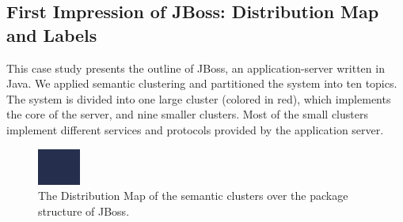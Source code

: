 \subsection{First Impression of JBoss: Distribution Map and Labels}\label{sec:azureus}

This case study presents the outline of JBoss, an application-server written in Java. We applied semantic clustering and partitioned the system into ten topics. The system is divided into one large cluster (colored in red), which implements the core of the server, and nine smaller clusters. Most of the small clusters implement different services and protocols provided by the application server.

\begin{figure}[htbp]
\begin{center}
  \includegraphics[width=\linewidth]{JBossDistribution}
  \caption{The Distribution Map of the semantic clusters over the package structure of JBoss.}
  \label{fig:JBossDistribution}
\end{center}
\end{figure}


